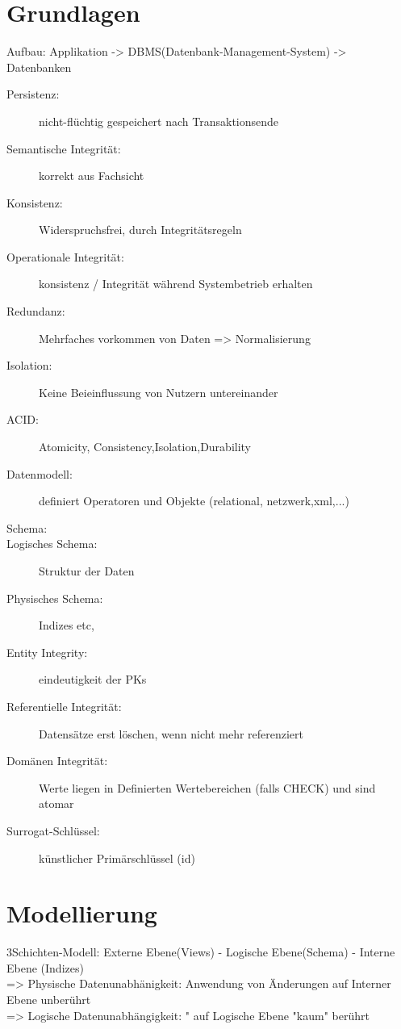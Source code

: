 \section*{Grundlagen}
Aufbau: Applikation -> DBMS(Datenbank-Management-System) -> Datenbanken

\begin{description}
\item[Persistenz:] nicht-flüchtig gespeichert nach Transaktionsende
\item[Semantische Integrität:] korrekt aus Fachsicht 
\item[Konsistenz:] Widerspruchsfrei, durch Integritätsregeln
\item[Operationale Integrität:] konsistenz / Integrität während Systembetrieb erhalten
\item[Redundanz:] Mehrfaches vorkommen von Daten => Normalisierung
\item[Isolation:] Keine Beieinflussung von Nutzern untereinander
\item[ACID:] Atomicity, Consistency,Isolation,Durability
\item[Datenmodell:] definiert Operatoren und Objekte (relational, netzwerk,xml,...)
\item[Schema:]
\item[Logisches Schema:] Struktur der Daten
\item[Physisches Schema:] Indizes etc,
\item[Entity Integrity:] eindeutigkeit der PKs
\item[Referentielle Integrität:] Datensätze erst löschen, wenn nicht mehr referenziert
\item[Domänen Integrität:] Werte liegen in Definierten Wertebereichen (falls CHECK) und sind atomar
\item[Surrogat-Schlüssel:] künstlicher Primärschlüssel (id)


\end{description}

\section*{Modellierung}

3Schichten-Modell: Externe Ebene(Views) - Logische Ebene(Schema) - Interne Ebene (Indizes)\\
=> Physische Datenunabhänigkeit: Anwendung von Änderungen auf Interner Ebene unberührt\\
=> Logische Datenunabhängigkeit: " auf Logische Ebene "kaum" berührt

